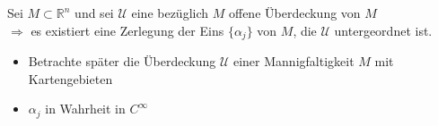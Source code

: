 \begin{proposition}
	Sei $M\subset\mathbb{R}^n$ und sei $\mathcal{U}$ eine bezüglich $M$ offene Überdeckung von $M$\\
	\hspace*{0.5em}$\Rightarrow$ es existiert eine Zerlegung der Eins $\{\alpha_j\}$ von $M$, die $\mathcal{U}$ untergeordnet ist.
\end{proposition}
\begin{*remark}\hspace*{0.5em}
	\vspace*{-1.5em}
	\begin{itemize}
		\item Betrachte später die Überdeckung $\mathcal{U}$ einer Mannigfaltigkeit $M$ mit Kartengebieten
		\item $\alpha_j$ in Wahrheit in $C^\infty$
	\end{itemize}
\end{*remark}

